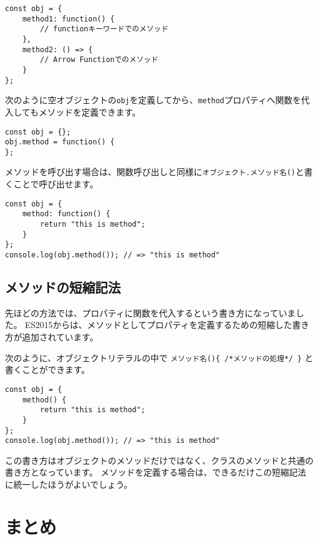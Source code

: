 \begin{lstlisting}
const obj = {
    method1: function() {
        // functionキーワードでのメソッド
    },
    method2: () => {
        // Arrow Functionでのメソッド
    }
};
\end{lstlisting}

次のように空オブジェクトの\texttt{obj}を定義してから、\texttt{method}プロパティへ関数を代入してもメソッドを定義できます。

\begin{lstlisting}
const obj = {};
obj.method = function() {
};
\end{lstlisting}

メソッドを呼び出す場合は、関数呼び出しと同様に\texttt{オブジェクト.\hbox{}メソッド名()}と書くことで呼び出せます。
\newpage
\begin{lstlisting}
const obj = {
    method: function() {
        return "this is method";
    }
};
console.log(obj.method()); // => "this is method"
\end{lstlisting}

\hypertarget{shorthand-for-method}{%
\subsection[メソッドの短縮記法]{メソッドの短縮記法\,\protect{}}\label{shorthand-for-method}}

先ほどの方法では、プロパティに関数を代入するという書き方になっていました。
ES2015からは、メソッドとしてプロパティを定義するための短縮した書き方が追加されています。

次のように、オブジェクトリテラルの中で
\texttt{メソッド名()\{ /*メソッドの処理*/ \}}
と書くことができます。

\begin{lstlisting}
const obj = {
    method() {
        return "this is method";
    }
};
console.log(obj.method()); // => "this is method"
\end{lstlisting}

この書き方はオブジェクトのメソッドだけではなく、クラスのメソッドと共通の書き方となっています。
メソッドを定義する場合は、できるだけこの短縮記法に統一したほうがよいでしょう。

\hypertarget{function-declaration-summary}{%
\section{まとめ}\label{function-declaration-summary}}

